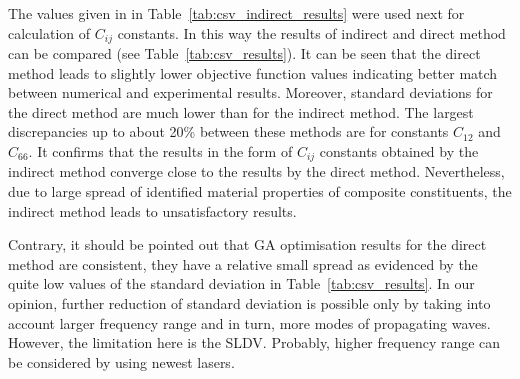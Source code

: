 \documentclass[preprint,12pt]{elsarticle}
\begin{document}
The values given in  in Table~\ref{tab:csv_indirect_results} were used next for calculation of $C_{ij}$ constants. In this way the results of indirect and direct method can be compared (see Table~\ref{tab:csv_results}). It can be seen that the direct method leads to slightly lower objective function values indicating better match between numerical and experimental results. Moreover, standard deviations for the direct method are much lower than for the indirect method. The largest discrepancies up to about 20\% between these methods are for constants $C_{12}$ and $C_{66}$. It confirms that the results in the form of $C_{ij}$ constants obtained by the indirect method converge close to the results by the direct method. Nevertheless, due to large spread of identified material properties of composite constituents, the indirect method leads to unsatisfactory results. 

Contrary, it should be pointed out that GA optimisation results for the direct method are consistent, they have a relative small spread as evidenced by the quite low values of the standard deviation in Table~\ref{tab:csv_results}. In our opinion, further reduction of standard deviation is possible only by taking into account larger frequency range and in turn, more modes of propagating waves. However, the limitation here is the SLDV. Probably, higher frequency range can be considered by using newest lasers. 

\end{document}

